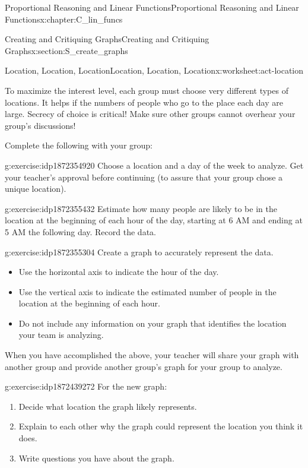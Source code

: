 \documentclass[oneside,10pt,]{book}
\numberwithin{equation}{chapter}
\begin{document}
\begin{chapterptx}{Proportional Reasoning and Linear Functions}{}{Proportional Reasoning and Linear Functions}{}{}{x:chapter:C_lin_funcs}
\begin{sectionptx}{Creating and Critiquing Graphs}{}{Creating and Critiquing Graphs}{}{}{x:section:S_create_graphs}
\begin{worksheet-subsection}{Location, Location, Location}{}{Location, Location, Location}{}{}{x:worksheet:act-location}
\begin{introduction}{}
To maximize the interest level, each group must choose very different types of locations. It helps if the numbers of people who go to the place each day are large. Secrecy of choice is critical! Make sure other groups cannot overhear your group's discussions!%
\par
Complete the following with your group:%
\end{introduction}%
\begin{divisionexercise}{1}{}{}{g:exercise:idp1872354920}%
Choose a location and a day of the week to analyze. Get your teacher's approval before continuing (to assure that your group chose a unique location).%
\end{divisionexercise}%
\begin{divisionexercise}{2}{}{}{g:exercise:idp1872355432}%
Estimate how many people are likely to be in the location at the beginning of each hour of the day, starting at 6 AM and ending at 5 AM the following day. Record the data.%
\end{divisionexercise}%
\begin{divisionexercise}{3}{}{}{g:exercise:idp1872355304}%
Create a graph to accurately represent the data.%
\begin{itemize}[label=\textbullet]
\item{}Use the horizontal axis to indicate the hour of the day.%
\item{}Use the vertical axis to indicate the estimated number of people in the location at the beginning of each hour.%
\item{}Do not include any information on your graph that identifies the location your team is analyzing.%
\end{itemize}
%
\par
When you have accomplished the above, your teacher will share your graph with another group and provide another group's graph for your group to analyze.%
\end{divisionexercise}%
\begin{divisionexercise}{4}{}{}{g:exercise:idp1872439272}%
For the new graph:%
\begin{enumerate}[font=\bfseries,label=(\alph*),ref=\alph*]
\item{}Decide what location the graph likely represents.%
\item{}Explain to each other why the graph could represent the location you think it does.%
\item{}Write questions you have about the graph.%
\end{enumerate}

\end{divisionexercise}
\end{worksheet-subsection}
\end{sectionptx}
\end{chapterptx}
\end{document}

